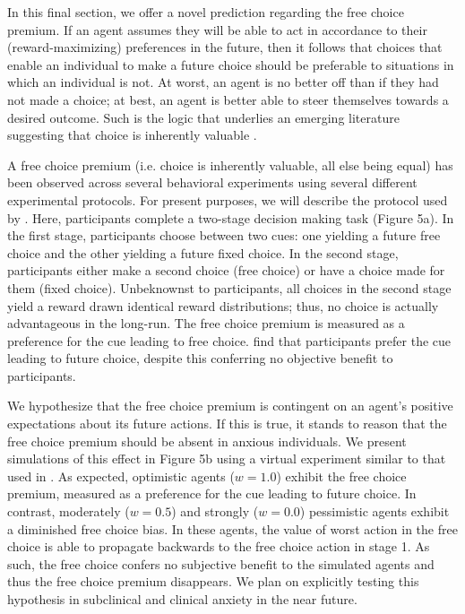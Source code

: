 \documentclass[11pt]{article} %
\begin{document}
In this final section, we offer a novel prediction regarding the free choice premium. If an agent assumes they will be able to act in accordance to their (reward-maximizing) preferences in the future, then it follows that choices that enable an individual to make a future choice should be preferable to situations in which an individual is not. At worst, an agent is no better off than if they had not made a choice; at best, an agent is better able to steer themselves towards a desired outcome. Such is the logic that underlies an emerging literature suggesting that choice is inherently valuable \citep{Leotti2010}.

A free choice premium (i.e. choice is inherently valuable, all else being equal) has been observed across several behavioral experiments \citep{Suzuki1997, Leotti2011, Leotti2014, Cockburn2014} using several different experimental protocols. For present purposes, we will describe the protocol used by \cite{Leotti2011, Leotti2014}. Here, participants complete a two-stage decision making task (Figure 5a). In the first stage, participants choose between two cues: one yielding a future free choice and the other yielding a future fixed choice. In the second stage, participants either make a second choice (free choice) or have a choice made for them (fixed choice). Unbeknownst to participants, all choices in the second stage yield a reward drawn identical reward distributions; thus, no choice is actually advantageous in the long-run. The free choice premium is measured as a preference for the cue leading to free choice. \cite{Leotti2011, Leotti2014} find that participants prefer the cue leading to future choice, despite this conferring no objective benefit to participants.

We hypothesize that the free choice premium is contingent on an agent's positive expectations about its future actions. If this is true, it stands to reason that the free choice premium should be absent in anxious individuals. We present simulations of this effect in Figure 5b using a virtual experiment similar to that used in \cite{Leotti2011, Leotti2014}. As expected, optimistic agents ($w=1.0$) exhibit the free choice premium, measured as a preference for the cue leading to future choice. In contrast, moderately ($w=0.5$) and strongly ($w=0.0$) pessimistic agents exhibit a diminished free choice bias. In these agents, the value of worst action in the free choice is able to propagate backwards to the free choice action in stage 1. As such, the free choice confers no subjective benefit to the simulated agents and thus the free choice premium disappears. We plan on explicitly testing this hypothesis in subclinical and clinical anxiety in the near future.
\end{document}
